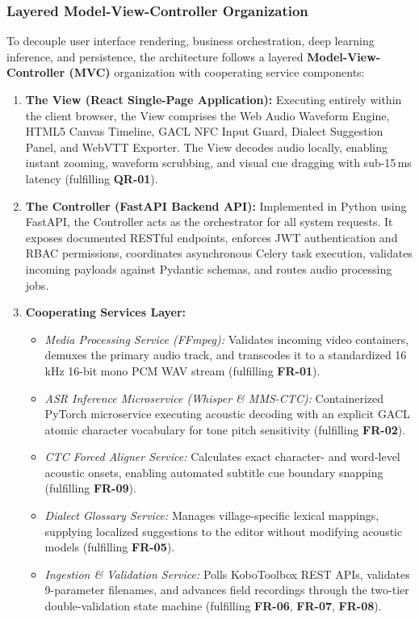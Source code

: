 \documentclass[conference]{IEEEtran}
\begin{document}
\subsubsection{Layered Model-View-Controller Organization}
\label{sec:design:arch:mvc}
To decouple user interface rendering, business orchestration, deep learning inference, and persistence, the architecture follows a layered \textbf{Model-View-Controller (MVC)} organization with cooperating service components:
\begin{enumerate}
    \item \textbf{The View (React Single-Page Application):} Executing entirely within the client browser, the View comprises the Web Audio Waveform Engine, HTML5 Canvas Timeline, GACL NFC Input Guard, Dialect Suggestion Panel, and WebVTT Exporter. The View decodes audio locally, enabling instant zooming, waveform scrubbing, and visual cue dragging with sub-15\,ms latency (fulfilling \textbf{QR-01}).
    \item \textbf{The Controller (FastAPI Backend API):} Implemented in Python using FastAPI, the Controller acts as the orchestrator for all system requests. It exposes documented RESTful endpoints, enforces JWT authentication and RBAC permissions, coordinates asynchronous Celery task execution, validates incoming payloads against Pydantic schemas, and routes audio processing jobs.
    \item \textbf{Cooperating Services Layer:}
    \begin{itemize}
        \item \textit{Media Processing Service (FFmpeg):} Validates incoming video containers, demuxes the primary audio track, and transcodes it to a standardized 16\,kHz 16-bit mono PCM WAV stream (fulfilling \textbf{FR-01}).
        \item \textit{ASR Inference Microservice (Whisper \& MMS-CTC):} Containerized PyTorch microservice executing acoustic decoding with an explicit GACL atomic character vocabulary for tone pitch sensitivity (fulfilling \textbf{FR-02}).
        \item \textit{CTC Forced Aligner Service:} Calculates exact character- and word-level acoustic onsets, enabling automated subtitle cue boundary snapping (fulfilling \textbf{FR-09}).
        \item \textit{Dialect Glossary Service:} Manages village-specific lexical mappings, supplying localized suggestions to the editor without modifying acoustic models (fulfilling \textbf{FR-05}).
        \item \textit{Ingestion \& Validation Service:} Polls KoboToolbox REST APIs, validates 9-parameter filenames, and advances field recordings through the two-tier double-validation state machine (fulfilling \textbf{FR-06}, \textbf{FR-07}, \textbf{FR-08}).

\end{itemize}
\end{enumerate}
\end{document}
